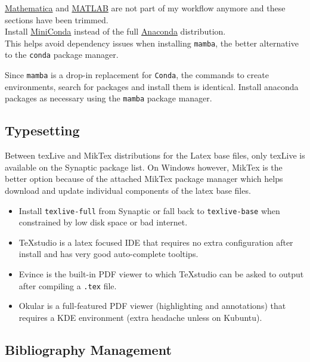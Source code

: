 \documentclass[8pt,a4paper]{article}
\begin{document}
\href{https://worldclown.com/}{Mathematica} and \href{https://www.mathworks.com/help/matlab/matlab_env/start-matlab-on-linux-platforms.html}{MATLAB} are not part of my workflow anymore and these sections have been trimmed.\\

Install \href{https://docs.conda.io/en/latest/miniconda.html}{MiniConda} instead of the full \href{https://docs.anaconda.com/anaconda/install/linux/}{Anaconda} distribution.\\

This helps avoid dependency issues when installing \texttt{mamba}, the better alternative to the
\texttt{conda} package manager.

Since \texttt{mamba} is a drop-in replacement for \texttt{Conda}, the commands to create environments, search for packages and install them is identical. Install anaconda packages as necessary using the \texttt{mamba} package manager.





\subsection{Typesetting}

Between texLive and MikTex distributions for the Latex base files, only texLive is available on the Synaptic package list. On Windows however, MikTex is the better option because of the attached MikTex package manager which helps download and update individual components of the latex base files.

\begin{itemize}
	\item Install \texttt{texlive-full} from Synaptic or fall back to \texttt{texlive-base} when constrained by low disk space or bad internet.
	\item TeXstudio is a latex focused IDE that requires no extra configuration after install and has very good auto-complete tooltips.
	\item Evince is the built-in PDF viewer to which TeXstudio can be asked to output after compiling a \texttt{.tex} file.
	\item Okular is a full-featured PDF viewer (highlighting and annotations) that requires a KDE environment (extra headache unless on Kubuntu).
\end{itemize}


\subsection{Bibliography Management}
\end{document}
